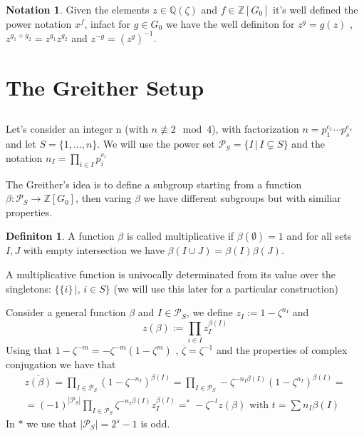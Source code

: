 \documentclass[]{article}
\theoremstyle{plain}
\theoremstyle{remark}
\theoremstyle{definition}
\newtheorem{deff}[teo]{Definiton}
\newtheorem*{nota}{Notation}
\newcommand{\PS}{\mathcal{P}_S}
\newcommand{\Z}{\mathbb{Z}}
\newcommand{\Q}{\mathbb{Q}}
\DeclareMathOperator*{\eqb }{=}
\begin{document}
	\begin{nota}
		Given the elements $ z \in \Q (\zeta) $ and $ f \in \Z[G_0]  $ it's well defined the power notation $ x^f $, infact for $ g\in G_0 $ we have the well definiton for $ z^g = g(z) $ , $ z ^{g_1 + g_2}= z^{g_1} z^{g_2} $ and $ z^{-g} = (z^g)^{-1} $. 
	\end{nota}
	

\section{The Greither Setup}

	\subsection*{}
	Let's consider an integer n (with $n \not \equiv 2 \mod 4$), with factorization $ n= p_1 ^{e_1} \cdots p_s ^{e_s} $ and let $ S = \{1, ... , n \}$. We will use the power set $ \PS = \{ I \,|\, I \subsetneq S\}$ and the notation $ n_I = \prod_{i \in I} p_i ^{e_i} $ 
	
	The Greither's idea is to define a subgroup starting from a function $ \beta : \PS \to \Z[G_0] $, then varing $\beta$ we have different subgroups but with similiar properties. 
	
	\begin{deff}
		A function $\beta$ is called multiplicative if $ \beta (\emptyset) = 1 $ and for all sets $ I,J $ with empty intersection we have $ \beta (I\cup J) = \beta(I) \beta(J)$.
	\end{deff}

	A multiplicative function is univocally determinated from its value over the singletons: $ \{\{i\} \,|,\, i \in S\} $ (we will use this later for a particular construction)

	Consider a general function $\beta$ and $ I \in \PS $, we define $ z_I  := 1 - \zeta ^{n_I}$ and 
	$$ z(\beta ):= \prod_{i\in I} z_I ^{\beta(I)} $$ 
	Using that $ 1 - \zeta ^{-m} = -\zeta^{-m} ( 1 - \zeta ^m ) $ , $ \overline{ \zeta} = \zeta ^{-1}  $ and the properties of complex conjugation we have that 
	\begin{multline}\label{eq:zbetacon}
		\overline{z(\beta )} = \prod_{I \in \PS} ({1 - \zeta ^{-n_I}})^{\beta(I)}  = \prod_{I \in \PS} - \zeta ^{-n_I \beta(I)} (1 - \zeta ^{n_I})^{\beta (I)} =\\
		=(-1)^{|\PS|}\prod_{I \in \PS} \zeta ^{-n_I \beta(I)} z_I^{\beta (I)} \eqb^\ast - \zeta^{-t} z(\beta) \text{ with } t = \sum n_I \beta(I)
	\end{multline}
	In $\ast$ we use that $ |\PS| = 2^s -1 $ is odd. 
	
\end{document}
